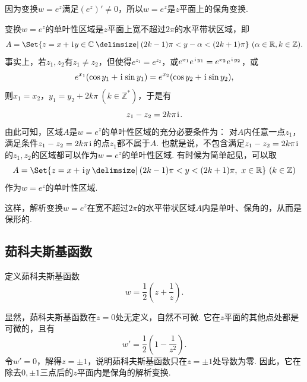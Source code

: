 因为变换\(w=e^z\)满足\((e^z)' \neq 0\)，所以\(w=e^z\)是\(z\)平面上的保角变换.

变换\(w=e^z\)的单叶性区域是\(z\)平面上宽不超过\(2\pi\)的水平带状区域，即\begin{equation*}
A = \Set{ z=x+\iu y \in \mathbb{C} \given (2k-1)\pi < y-\alpha < (2k+1)\pi }\ (\alpha\in\mathbb{R}, k\in\mathbb{Z}).
\end{equation*}事实上，若\(z_1,z_2\)有\(z_1 \neq z_2\)，但使得\(e^{z_1} = e^{z_2}\)，或\(e^{x_1}e^{\kern1pt\mathrm{i}\kern1pt y_1} = e^{x_2}e^{\kern1pt\mathrm{i}\kern1pt y_2}\)，或\begin{equation*}
e^{x_1}(\cos y_1 + \kern1pt\mathrm{i}\kern1pt \sin y_1) = e^{x_2}(\cos y_2 + \kern1pt\mathrm{i}\kern1pt \sin y_2),
\end{equation*}则\(x_1 = x_2\)，\(y_1 = y_2 + 2k\pi\ (k\in\mathbb{Z}^*)\)，于是有\begin{equation*}
z_1 - z_2 = 2k\pi\kern1pt\mathrm{i}\kern1pt.
\end{equation*}由此可知，区域\(A\)是\(w = e^z\)的单叶性区域的充分必要条件为：
对\(A\)内任意一点\(z_1\)，满足条件\(z_1 - z_2 = 2k\pi\kern1pt\mathrm{i}\kern1pt\)的点\(z_1\)都不属于\(A\).
也就是说，不包含满足\(z_1 - z_2 = 2k\pi\kern1pt\mathrm{i}\kern1pt\)的\(z_1,z_2\)的区域都可以作为\(w = e^z\)的单叶性区域.
有时候为简单起见，可以取\begin{equation*}
A = \Set{ z=x+\iu y \given (2k-1)\pi < y < (2k+1)\pi,\ x \in \mathbb{R} }\ (k\in\mathbb{Z})
\end{equation*}作为\(w = e^z\)的单叶性区域.

这样，解析变换\(w = e^z\)在宽不超过\(2\pi\)的水平带状区域\(A\)内是单叶、保角的，从而是保形的.

\subsection{茹科夫斯基函数}
\begin{definition}
定义茹科夫斯基函数\begin{equation*}
w = \frac{1}{2} \left(z + \frac{1}{z}\right).
\end{equation*}
\end{definition}

显然，茹科夫斯基函数在\(z=0\)处无定义，自然不可微.
它在\(z\)平面的其他点处都是可微的，且有\begin{equation*}
w' = \frac{1}{2} \left(1 - \frac{1}{z^2}\right).
\end{equation*}令\(w' = 0\)，解得\(z=\pm1\)，说明茹科夫斯基函数只在\(z=\pm1\)处导数为零.
因此，它在除去\(0,\pm1\)三点后的\(z\)平面内是保角的解析变换.

